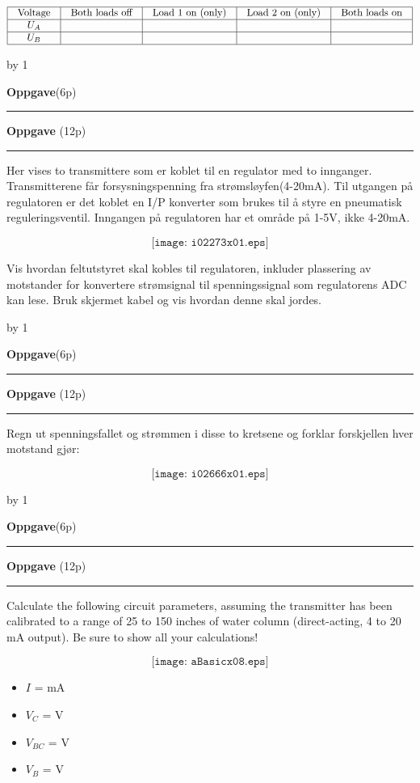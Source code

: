 \documentclass[12pt,a4paper]{article}
\def\oppgave{
            \advance\questnum by 1
	    \ifthenelse{\questnum>0\AND \questnum<9}
	    {
                \vskip 1cm
		\textbf{Oppgave}\hskip 5pt\the\questnum \hfill \hfill(6p)
		\vskip 3pt
		\hrule
	\vskip 0.5cm}
	{
                \vskip 1cm
		\textbf{Oppgave}\hskip 5pt \the\questnum \hfill \hfill(12p)
		\vskip 3pt \hrule \vskip 0.5cm }

		}
\begin{document}
$$\vbox{\offinterlineskip
\halign{\strut
\vrule \quad\hfil # \ \hfil & 
\vrule \quad\hfil # \ \hfil & 
\vrule \quad\hfil # \ \hfil & 
\vrule \quad\hfil # \ \hfil & 
\vrule \quad\hfil # \ \hfil \vrule \cr
\noalign{\hrule}
%
Voltage & Both loads off & Load 1 on (only) & Load 2 on (only) & Both loads on \cr
%
\noalign{\hrule}
%
$U_A$ &  &  &  &  \cr
%
\noalign{\hrule}
%
$U_B$ &  &  &  &  \cr
%
\noalign{\hrule}
} %
}$$ %

\vskip 2.5pt 

\vskip 2.5pt 

\vskip 2.5pt 
\newpage
\oppgave{}%
\vskip 2.5pt 
Her vises to transmittere som er koblet til en regulator med to innganger. Transmitterene får forsysningspenning fra strømsløyfen(4-20mA). Til utgangen på regulatoren er det koblet en I/P konverter som brukes til å styre en pneumatisk reguleringsventil. Inngangen på regulatoren har et område på 1-5V, ikke 4-20mA. 

$$\texttt{[image: i02273x01.eps]}$$

Vis hvordan feltutstyret skal kobles til regulatoren, inkluder plassering av motstander for konvertere strømsignal til spenningssignal som regulatorens ADC kan lese. Bruk skjermet kabel og vis hvordan denne skal jordes. 



\vskip 2.5pt 

\vskip 2.5pt 
\newpage
\oppgave{}%
\vskip 2.5pt 
Regn ut spenningsfallet og strømmen i disse to kretsene og forklar forskjellen hver motstand gjør:

$$\texttt{[image: i02666x01.eps]}$$


\vskip 2.5pt 
\newpage
\oppgave{}%
\vskip 2.5pt 

Calculate the following circuit parameters, assuming the transmitter has been calibrated to a range of 25 to 150 inches of water column (direct-acting, 4 to 20 mA output).  Be sure to show all your calculations!

$$\texttt{[image: aBasicx08.eps]}$$
\begin{itemize}
\item{} $I$ = \underbar{\hskip 50pt} mA
\vskip 10pt
\item{} $V_{C}$ = \underbar{\hskip 50pt} V 
\vskip 10pt
\item{} $V_{BC}$ = \underbar{\hskip 50pt} V 
\vskip 10pt
\item{} $V_{B}$ = \underbar{\hskip 50pt} V 
\end{itemize}
\vskip 2.5pt 
\end{document}
